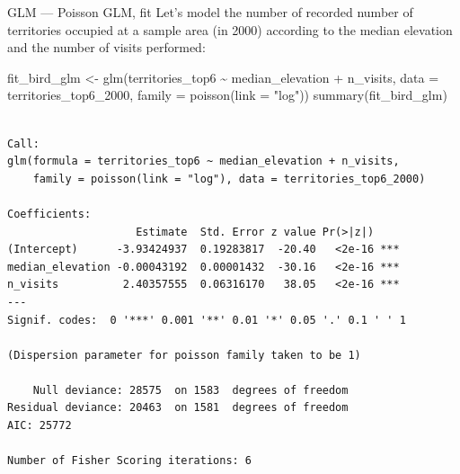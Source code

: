 \documentclass[
  10pt,
  ignorenonframetext,
  aspectratio=169,
  t]{beamer}
\newenvironment{Shaded}{\begin{snugshade}}{\end{snugshade}}
\newcommand{\AttributeTok}[1]{\textcolor[rgb]{0.40,0.45,0.13}{#1}}
\newcommand{\FunctionTok}[1]{\textcolor[rgb]{0.28,0.35,0.67}{#1}}
\newcommand{\NormalTok}[1]{\textcolor[rgb]{0.00,0.23,0.31}{#1}}
\newcommand{\OtherTok}[1]{\textcolor[rgb]{0.00,0.23,0.31}{#1}}
\newcommand{\SpecialCharTok}[1]{\textcolor[rgb]{0.37,0.37,0.37}{#1}}
\newcommand{\StringTok}[1]{\textcolor[rgb]{0.13,0.47,0.30}{#1}}
\begin{document}
\begin{frame}[fragile]{GLM --- Poisson GLM, fit}
\protect{}\label{glm-poisson-glm-fit}
Let's model the number of recorded number of territories occupied at a
sample area (in 2000) according to the median elevation and the number
of visits performed:

\scriptsize

\begin{Shaded}
\begin{Highlighting}[]
\NormalTok{fit\_bird\_glm }\OtherTok{\textless{}{-}} \FunctionTok{glm}\NormalTok{(territories\_top6 }\SpecialCharTok{\textasciitilde{}}\NormalTok{ median\_elevation }\SpecialCharTok{+}\NormalTok{ n\_visits, }\AttributeTok{data =}\NormalTok{ territories\_top6\_2000,}
                    \AttributeTok{family =} \FunctionTok{poisson}\NormalTok{(}\AttributeTok{link =} \StringTok{"log"}\NormalTok{))}
\FunctionTok{summary}\NormalTok{(fit\_bird\_glm)}
\end{Highlighting}
\end{Shaded}

\begin{verbatim}

Call:
glm(formula = territories_top6 ~ median_elevation + n_visits, 
    family = poisson(link = "log"), data = territories_top6_2000)

Coefficients:
                    Estimate  Std. Error z value Pr(>|z|)    
(Intercept)      -3.93424937  0.19283817  -20.40   <2e-16 ***
median_elevation -0.00043192  0.00001432  -30.16   <2e-16 ***
n_visits          2.40357555  0.06316170   38.05   <2e-16 ***
---
Signif. codes:  0 '***' 0.001 '**' 0.01 '*' 0.05 '.' 0.1 ' ' 1

(Dispersion parameter for poisson family taken to be 1)

    Null deviance: 28575  on 1583  degrees of freedom
Residual deviance: 20463  on 1581  degrees of freedom
AIC: 25772

Number of Fisher Scoring iterations: 6
\end{verbatim}

\normalsize
\end{frame}
\end{document}
